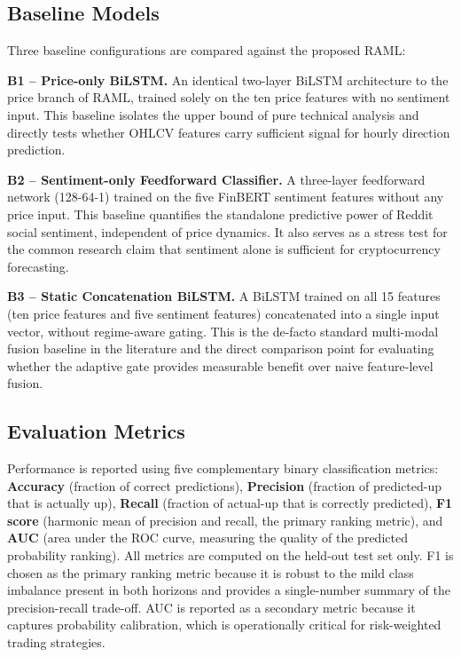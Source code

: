 \documentclass[journal]{IEEEtran}
\newcommand{\raml}{\textsc{RAML}}
\newcommand{\bilstm}{BiLSTM}
\begin{document}
\subsection{Baseline Models}
Three baseline configurations are compared against the proposed \raml{}:

\textbf{B1 -- Price-only \bilstm{}.}
An identical two-layer \bilstm{} architecture to the price branch of \raml{},
trained solely on the ten price features with no sentiment input. This baseline
isolates the upper bound of pure technical analysis and directly tests whether
OHLCV features carry sufficient signal for hourly direction prediction.

\textbf{B2 -- Sentiment-only Feedforward Classifier.}
A three-layer feedforward network (128-64-1) trained on the five FinBERT
sentiment features without any price input. This baseline quantifies the
standalone predictive power of Reddit social sentiment, independent of price
dynamics. It also serves as a stress test for the common research claim that
sentiment alone is sufficient for cryptocurrency forecasting.

\textbf{B3 -- Static Concatenation \bilstm{}.}
A \bilstm{} trained on all 15 features (ten price features and five sentiment
features) concatenated into a single input vector, without regime-aware gating.
This is the de-facto standard multi-modal fusion baseline in the literature
and the direct comparison point for evaluating whether the adaptive gate
provides measurable benefit over naive feature-level fusion.

\subsection{Evaluation Metrics}
Performance is reported using five complementary binary classification metrics:
\textbf{Accuracy} (fraction of correct predictions),
\textbf{Precision} (fraction of predicted-up that is actually up),
\textbf{Recall} (fraction of actual-up that is correctly predicted),
\textbf{F1 score} (harmonic mean of precision and recall, the primary
ranking metric), and \textbf{AUC} (area under the ROC curve, measuring
the quality of the predicted probability ranking). All metrics are computed
on the held-out test set only. F1 is chosen as the primary ranking metric
because it is robust to the mild class imbalance present in both horizons
and provides a single-number summary of the precision-recall trade-off.
AUC is reported as a secondary metric because it captures probability
calibration, which is operationally critical for risk-weighted trading
strategies.
\end{document}
